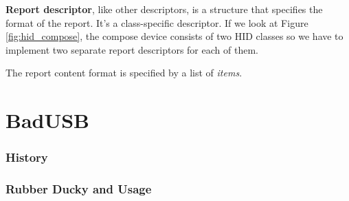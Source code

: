 \textbf{Report descriptor}, like other descriptors, is a structure that specifies the format of the report. It's a class-specific descriptor. If we look at Figure \ref{fig:hid_compose}, the compose device consists of two HID classes so we have to implement two separate report descriptors for each of them. 

The report content format is specified by a list of \emph{items}.
\chapter{BadUSB}
\label{badusb}
\subsection*{History}
\subsection*{Rubber Ducky and Usage}
\label{examples}






